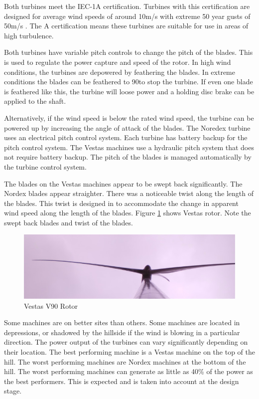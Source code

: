 \documentclass[12pt]{article} %
\begin{document}
Both turbines meet the IEC-1A certification. Turbines with this certification are designed for average wind speeds of around 10m/s with extreme 50 year gusts of 50m/s \cite{burton_wind_2001}. The A certification means these turbines are suitable for use in areas of high turbulence.

Both turbines have variable pitch controls to change the pitch of the blades. This is used to regulate the power capture and speed of the rotor. In high wind conditions, the turbines are depowered by feathering the blades. In extreme conditions the blades can be feathered to 90\degree to stop the turbine. If even one blade is feathered like this, the turbine will loose power and a holding disc brake can be applied to the shaft.

Alternatively, if the wind speed is below the rated wind speed, the turbine can be powered up by increasing the angle of attack of the blades.
The Noredex turbine uses an electrical pitch control system. Each turbine has battery backup for the pitch control system.
The Vestas machines use a hydraulic pitch system that does not require battery backup.
The pitch of the blades is managed automatically by the turbine control system.

The blades on the Vestas machines appear to be swept back significantly. The Nordex blades appear straighter. There was a noticeable twist along the length of the blades. This twist is designed in to accommodate the change in apparent wind speed along the length of the blades. Figure \ref{fig:vestasrotor} shows Vestas rotor. Note the swept back blades and twist of the blades.

\begin{figure} %
  \begin{center}
    \includegraphics[width=1\textwidth]{turbine_blades}
  \end{center}
  \caption{Vestas V90 Rotor}
  \label{fig:vestasrotor}
\end{figure}

Some machines are on better sites than others. Some machines are located in depressions, or shadowed by the hillside if the wind is blowing in a particular direction. The power output of the turbines can vary significantly depending on their location. The best performing machine is a Vestas machine on the top of the hill. The worst performing machines are Nordex machines at the bottom of the hill.
The worst performing machines can generate as little as 40\% of the power as the best performers. This is expected and is taken into account at the design stage.
\end{document}
